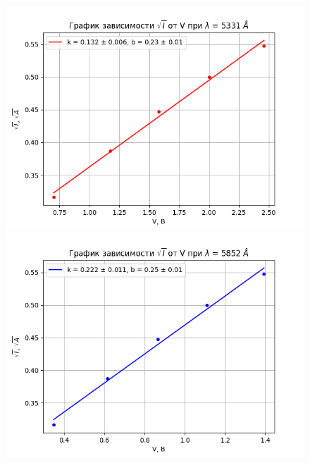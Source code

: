 \documentclass[a4paper,12pt]{article}
\begin{document}
\begin{figure}[H]
  \centering
  \begin{minipage}[b]{0.48\textwidth}
    \includegraphics[width=\textwidth]{line1.png}
  \end{minipage}
  \hfill
  \begin{minipage}[b]{0.48\textwidth}
    \includegraphics[width=\textwidth]{line2.png}
  \end{minipage}
  \hfill
  \begin{minipage}[b]{0.48\textwidth}

\end{minipage}
\end{figure}
\end{document}
